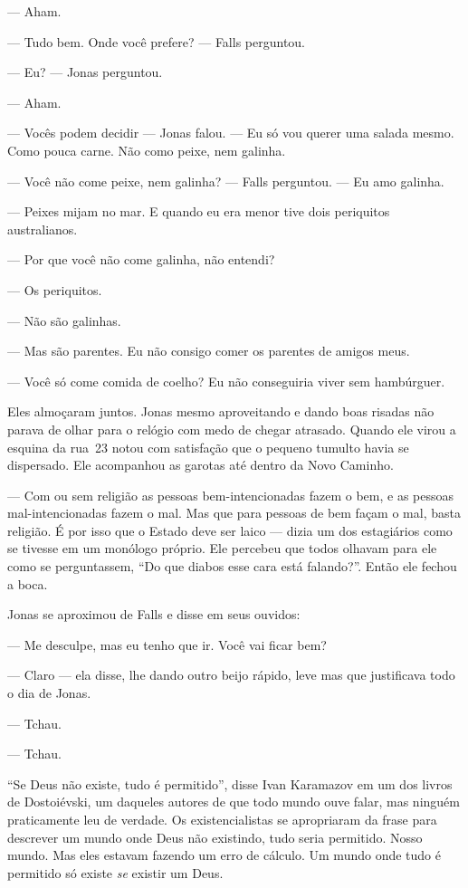 --- Aham.

--- Tudo bem. Onde você prefere? --- Falls perguntou.

--- Eu? --- Jonas perguntou.

--- Aham.

--- Vocês podem decidir --- Jonas falou. --- Eu só vou querer uma salada mesmo. Como pouca carne. Não como peixe, nem galinha.

--- Você não come peixe, nem galinha? --- Falls perguntou. --- Eu amo galinha.

--- Peixes mijam no mar. E quando eu era menor\mudanca{,} tive dois periquitos australianos.

--- Por que você não come galinha, não entendi?

--- Os periquitos.

--- Não são galinhas.

--- Mas são parentes. Eu não consigo comer os parentes de amigos meus.

--- Você só come comida de coelho? Eu não conseguiria viver sem hambúrguer.

Eles almoçaram juntos. Jonas\mudanca{,} mesmo aproveitando e dando boas risadas\mudanca{,} não parava de olhar para o relógio\mudanca{,} com medo de chegar atrasado. Quando ele virou a esquina da rua~23 notou com satisfação que o pequeno tumulto havia se dispersado. Ele acompanhou as garotas até dentro da Novo Caminho.

--- Com ou sem religião as pessoas bem-intencionadas fazem o bem, e as pessoas mal-intencionadas fazem o mal. Mas que para pessoas de bem façam o mal, basta religião. É por isso que o Estado deve ser laico --- dizia um dos estagiários como se tivesse em um monólogo próprio. Ele percebeu que todos olhavam para ele como se perguntassem, ``Do que diabos esse cara está falando?''. Então ele fechou a boca.

Jonas se aproximou de Falls e disse em seus ouvidos:

--- Me desculpe, mas eu tenho que ir. Você vai ficar bem?

--- Claro --- ela disse, lhe dando outro beijo rápido, leve\mudanca{,} mas que justificava todo o dia de Jonas.

--- Tchau.

--- Tchau.

``Se Deus não existe, tudo é permitido'', disse Ivan Karamazov em um dos livros de Dostoiévski, um daqueles autores de que todo mundo ouve falar, mas ninguém praticamente leu de verdade. Os existencialistas se apropriaram da frase para descrever um mundo onde\mudanca{,} Deus não existindo, tudo seria permitido. Nosso mundo. Mas eles estavam fazendo um erro de cálculo. Um mundo onde tudo é permitido só existe \emph{se} existir um Deus.

